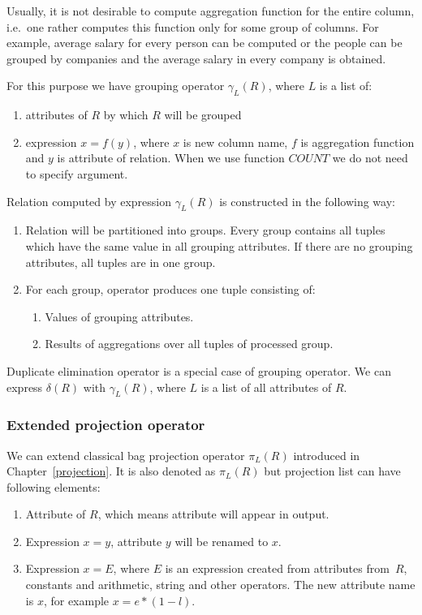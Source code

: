 Usually, it is not desirable to compute aggregation function for the entire column, i.e.~one rather computes this function only for some group of columns. For example, average salary for every person can be computed or the people can be grouped by companies and the average salary in every company is obtained. 

For this purpose we have grouping operator $\gamma_L(R)$, where $L$ is a list of:

\begin{enumerate}
\item attributes of $R$ by which $R$ will be grouped
\item expression $x=f(y)$, where $x$ is new column name, $f$ is aggregation function and $y$ is attribute of relation. When we use function $COUNT$ we do not need to specify argument.
\end{enumerate}

Relation computed by expression $\gamma_L(R)$ is constructed in the following way:

\begin{enumerate}
\item Relation will be partitioned into groups. Every group contains all tuples which have the same value in all grouping attributes. If there are no grouping attributes, all tuples are in one group.
\item For each group, operator produces one tuple consisting of:
 \begin{enumerate}
 	\item Values of grouping attributes.
 	\item Results of aggregations over all tuples of processed group.
 \end{enumerate}
\end{enumerate}

Duplicate elimination operator is a special case of grouping operator. We can express $\delta(R)$ with $\gamma_{L}(R)$, where $L$ is a list of all attributes of $R$.

\subsubsection{Extended projection operator}

We can extend classical bag projection operator $\pi_L(R)$ introduced in Chapter~\ref{projection}. It is also denoted as $\pi_L(R)$ but projection list can have following elements:

\begin{enumerate}
\item Attribute of $R$, which means attribute will appear in output.
\item Expression $x = y$, attribute $y$ will be renamed to $x$.
\item Expression $x = E$, where $E$ is an expression created from attributes from~$R$, constants and arithmetic, string and other operators. The new attribute name is $x$, for example $x=e*(1-l)$.
\end{enumerate}



